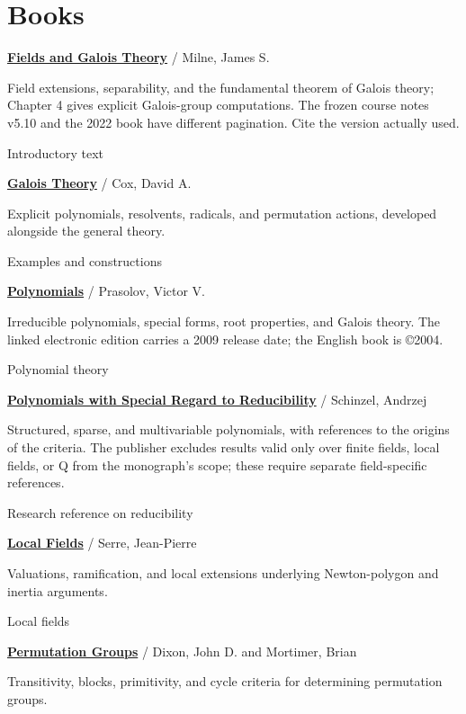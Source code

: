\documentclass[11pt,a4paper,oneside,openany]{book}
\begin{document}
\section*{Books}
\textbf{\hyperlink{ref:Milne2022}{Fields and Galois Theory}} / Milne, James S.\par
Field extensions, separability, and the fundamental theorem of Galois theory; Chapter 4 gives explicit Galois-group computations. The frozen course notes v5.10 and the 2022 book have different pagination. Cite the version actually used.\par
{\small Introductory text}\par\medskip
{}\textbf{\hyperlink{ref:Cox2012}{Galois Theory}} / Cox, David A.\par
Explicit polynomials, resolvents, radicals, and permutation actions, developed alongside the general theory.\par
{\small Examples and constructions}\par\medskip
{}\textbf{\hyperlink{ref:Prasolov2004}{Polynomials}} / Prasolov, Victor V.\par
Irreducible polynomials, special forms, root properties, and Galois theory. The linked electronic edition carries a 2009 release date; the English book is ©2004.\par
{\small Polynomial theory}\par\medskip
{}\textbf{\hyperlink{ref:Schinzel2000}{Polynomials with Special Regard to Reducibility}} / Schinzel, Andrzej\par
Structured, sparse, and multivariable polynomials, with references to the origins of the criteria. The publisher excludes results valid only over finite fields, local fields, or Q from the monograph's scope; these require separate field-specific references.\par
{\small Research reference on reducibility}\par\medskip
{}\textbf{\hyperlink{ref:Serre1979}{Local Fields}} / Serre, Jean-Pierre\par
Valuations, ramification, and local extensions underlying Newton-polygon and inertia arguments.\par
{\small Local fields}\par\medskip
{}\textbf{\hyperlink{ref:DixonMortimer1996}{Permutation Groups}} / Dixon, John D. and Mortimer, Brian\par
Transitivity, blocks, primitivity, and cycle criteria for determining permutation groups.\par
\end{document}
